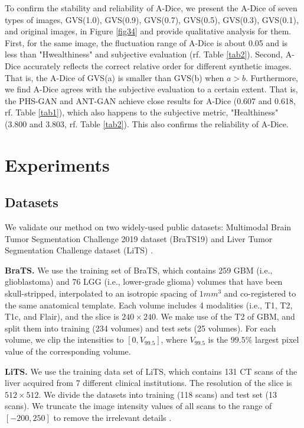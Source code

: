 \documentclass[journal,twoside,web]{ieeecolor}
\begin{document}
To confirm the stability and reliability of A-Dice, we present the A-Dice of seven types of images, GVS(1.0), GVS(0.9), GVS(0.7), GVS(0.5), GVS(0.3), GVS(0.1), and original images, in Figure \ref{fig34} and provide qualitative analysis for them. First, for the same image, the fluctuation range of A-Dice is about 0.05 and is less than "Hwealthiness" \cite{xia2020pseudo} and subjective evaluation (rf. Table \ref{tab2}). Second, A-Dice accurately reflects the correct relative order for different synthetic images. That is, the A-Dice of GVS(a) is smaller than GVS(b) when $a>b$. Furthermore, we find A-Dice agrees with the subjective evaluation to a certain extent. That is, the PHS-GAN and ANT-GAN achieve close results for A-Dice (0.607 and 0.618, rf. Table \ref{tab1}), which also happens to the subjective metric, "Healthiness" (3.800 and 3.803, rf. Table \ref{tab2}). This also confirms the reliability of A-Dice.

\section{Experiments} \label{sec5}
\subsection{Datasets}
We validate our method on two widely-used public datasets: Multimodal Brain Tumor Segmentation Challenge 2019 dataset (BraTS19) \cite{menze2014multimodal,bakas2017advancing} and Liver Tumor Segmentation Challenge dataset (LiTS) \cite{bilic2019liver}.

\noindent\textbf{BraTS.} We use the training set of BraTS, which contains 259 GBM (i.e., glioblastoma)  and 76 LGG (i.e., lower-grade glioma) volumes that have been skull-stripped, interpolated to an isotropic spacing of $1mm^3$ and co-registered to the same anatomical template. Each volume includes 4 modalities (i.e., T1, T2, T1c, and Flair), and the slice is $240\times240$. We make use of the T2 of GBM, and split them into training (234 volumes) and test sets (25 volumes). For each volume, we clip the intensities to $[0, V_{99.5}]$, where $V_{99.5}$ is the $99.5\%$ largest pixel value of the corresponding volume.

\noindent \textbf{LiTS.} We use the training data set of LiTS, which contains 131 CT scans of the liver acquired from 7 different clinical institutions. The resolution of the slice is $512\times512$.  We divide the datasets into training (118 scans) and test set (13 scans). We truncate the image intensity values of all scans to the range of $[-200,250]$ to remove the irrelevant details \cite{li2018h}.
\end{document}
